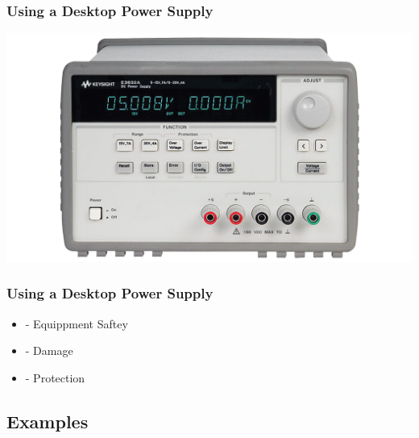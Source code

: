 \documentclass[fleqn]{beamer} %
\newcommand{\sectionIIsubsectionIIItitle}{Using a Desktop Power Supply}
\newcommand{\sectionIIsubsectionIVtitle}{Examples}
\begin{document}
			\begin{frame}
				\frametitle{\sectionIIsubsectionIIItitle}

				\includegraphics[scale=.15]{images/hp_psu.png} 

			\end{frame}

			\begin{frame}
			\frametitle{\sectionIIsubsectionIIItitle}

				\begin{itemize}

					\item - Equippment Saftey \vspccc
					\item - Damage \vspccc
					\item - Protection \vspccc

				\end{itemize}

			\end{frame}

		\subsection{\sectionIIsubsectionIVtitle}\label{sectionIIsubsectionIV}
\end{document}
